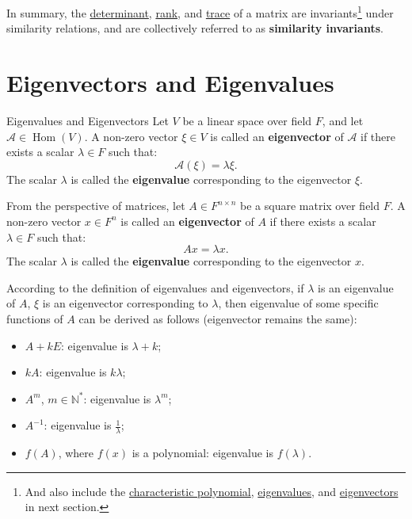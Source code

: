 \documentclass[11pt]{../../TexTemplate/elegantbook} %
\begin{document}
\vspace{0.7cm}
In summary, the \underline{determinant}, \underline{rank}, and \underline{trace} of a matrix are invariants\footnote{
    And also include the \underline{characteristic polynomial}, \underline{eigenvalues}, and \underline{eigenvectors} 
    in next section.
} under similarity relations, 
and are collectively referred to as \textbf{similarity invariants}.


\section{Eigenvectors and Eigenvalues}
\begin{definition}{Eigenvalues and Eigenvectors}
    Let \( V \) be a linear space over field \( F \), 
    and let \( \mathcal{A}\in \operatorname{Hom}(V) \).
    A non-zero vector \( \xi \in V \) is called an \textbf{eigenvector} of \( \mathcal{A} \)
    if there exists a scalar \( \lambda \in F \) such that:
    \[
    \mathcal{A}(\xi) = \lambda \xi.
    \]
    The scalar \( \lambda \) is called the \textbf{eigenvalue} corresponding to the eigenvector \( \xi \).
    
    From the perspective of matrices,
    let \( A \in F^{n \times n} \) be a square matrix over field \( F \).
    A non-zero vector \( x \in F^n \) is called an \textbf{eigenvector} of \( A \)
    if there exists a scalar \( \lambda \in F \) such that:
    \[
    A x = \lambda x.
    \]
    The scalar \( \lambda \) is called the \textbf{eigenvalue} corresponding to the eigenvector \( x \).
\end{definition}

According to the definition of eigenvalues and eigenvectors,
if \( \lambda \) is an eigenvalue of \( A \), \(\xi\) is an eigenvector corresponding to \( \lambda \),
then eigenvalue of some specific functions of \( A \) can be derived as follows (eigenvector remains the same):
\begin{itemize}
    \item \(A + kE\): eigenvalue is \( \lambda + k \);
    \item \(kA\): eigenvalue is \( k\lambda \);
    \item \(A^m\), \(m \in \mathbb{N}^{*}\): eigenvalue is \( \lambda^m \);
    \item \(A^{-1}\): eigenvalue is \( \frac{1}{\lambda} \);
    \item \(f(A)\), where \(f(x)\) is a polynomial: eigenvalue is \( f(\lambda) \).
\end{itemize}
\end{document}
